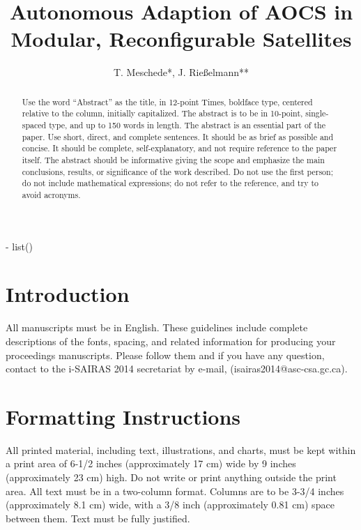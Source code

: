 \documentclass[letter,twocolumn]{article}
\begin{document}
\title{Autonomous Adaption of AOCS in Modular, Reconfigurable Satellites}
\subtitle{}
\author{T. Meschede*, J. Rießelmann**}

\maketitle
\thispagestyle{empty}

\begin{abstract}
Use the word ``Abstract'' as the title, in 12-point Times, boldface type, centered relative to the column, initially capitalized. The abstract is to be in 10-point, single-spaced type, and up to 150 words in length. The abstract is an essential part of the paper. Use short, direct, and complete sentences. It should be as brief as possible and concise. It should be complete, self-explanatory, and not require reference to the paper itself. The abstract should be informative giving the scope and emphasize the main conclusions, results, or significance of the work described. Do not use the first person; do not include mathematical expressions; do not refer to the reference, and try to avoid acronyms.
\end{abstract}

- list()

\section{Introduction}
All manuscripts must be in English. These guidelines include complete descriptions of the fonts, spacing, and related information for producing your proceedings manuscripts. Please follow them and if you have any question, contact to the i-SAIRAS 2014 secretariat by e-mail, (isairas2014@asc-csa.gc.ca).

\section{Formatting Instructions}
All printed material, including text, illustrations, and charts, must be kept within a print area of 6-1/2 inches (approximately 17 cm) wide by 9 inches (approximately 23 cm) high. Do not write or print anything outside the print area. All text must be in a two-column format. Columns are to be 3-3/4 inches (approximately 8.1 cm) wide, with a 3/8 inch (approximately 0.81 cm) space between them. Text must be fully justified.
\end{document}
